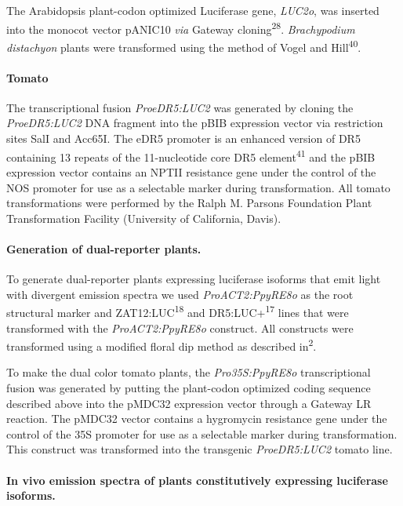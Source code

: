\documentclass[]{article}
\begin{document}
The Arabidopsis plant-codon optimized Luciferase gene, \emph{LUC2o}, was
inserted into the monocot vector pANIC10 \emph{via} Gateway
cloning\textsuperscript{28}. \emph{Brachypodium distachyon} plants were
transformed using the method of Vogel and Hill\textsuperscript{40}.

\paragraph{Tomato}\label{tomato}

The transcriptional fusion \emph{ProeDR5:LUC2} was generated by cloning
the \emph{ProeDR5:LUC2} DNA fragment into the pBIB expression vector via
restriction sites SalI and Acc65I. The eDR5 promoter is an enhanced
version of DR5 containing 13 repeats of the 11-nucleotide core DR5
element\textsuperscript{41} and the pBIB expression vector contains an
NPTII resistance gene under the control of the NOS promoter for use as a
selectable marker during transformation. All tomato transformations were
performed by the Ralph M. Parsons Foundation Plant Transformation
Facility (University of California, Davis).

\paragraph{Generation of dual-reporter
plants.}\label{generation-of-dual-reporter-plants.}

To generate dual-reporter plants expressing luciferase isoforms that
emit light with divergent emission spectra we used
\emph{ProACT2:PpyRE8o} as the root structural marker and
ZAT12:LUC\textsuperscript{18} and DR5:LUC+\textsuperscript{17} lines
that were transformed with the \emph{ProACT2:PpyRE8o} construct. All
constructs were transformed using a modified floral dip method as
described in\textsuperscript{2}.

To make the dual color tomato plants, the \emph{Pro35S:PpyRE8o}
transcriptional fusion was generated by putting the plant-codon
optimized coding sequence described above into the pMDC32 expression
vector through a Gateway LR reaction. The pMDC32 vector contains a
hygromycin resistance gene under the control of the 35S promoter for use
as a selectable marker during transformation. This construct was
transformed into the transgenic \emph{ProeDR5:LUC2} tomato line.

\paragraph{In vivo emission spectra of plants constitutively expressing
luciferase
isoforms.}\label{in-vivo-emission-spectra-of-plants-constitutively-expressing-luciferase-isoforms.}
\end{document}
